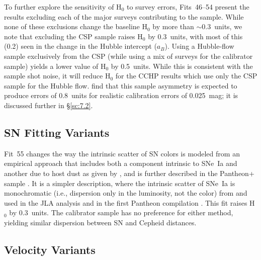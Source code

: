 \documentclass[12pt]{aastex631}
\begin{document}
To further explore the sensitivity of H$_0$ to survey errors, Fits~46--54 present the results excluding each of the major surveys contributing to the sample.  While none of these exclusions change the baseline H$_0$ by more than $\sim 0.3$~units, we note that excluding the CSP sample raises H$_0$ by 0.3~units, with most of this (0.2) seen in the change in the Hubble intercept ($a_B$). Using a Hubble-flow sample exclusively from the CSP (while using a mix of surveys for the calibrator sample) yields a lower value of H$_0$ by 0.5~units.  While this is consistent with the sample shot noise, it will reduce H$_0$ for the CCHP results which use only the CSP sample for the Hubble flow.  \citet{Brownsberger:2021} find that this sample asymmetry is expected to produce errors of 0.8~units for realistic calibration errors of 0.025~mag; it is discussed further in \S\ref{sc:7.2}.  

\subsection{SN Fitting Variants\label{sc:6.11}}

Fit~55 changes the way the intrinsic scatter of SN colors is modeled from an empirical approach that includes both a component intrinsic to SNe~Ia and another due to host dust as given by \citet{Brout:2021}, and is further described in the Pantheon+ sample \citep{Brout:2022,Scolnic:2021}. It is a simpler description, where the intrinsic scatter of SNe~Ia is monochromatic (i.e., dispersion only in the luminosity, not the color) from \citet{Guy:2010} and used in the JLA analysis \citep{Betoule:2014} and in the first Pantheon compilation \citep{Scolnic:2018}.  This fit raises H$_0$ by 0.3~units.  The calibrator sample has no preference for either method, yielding similar dispersion between SN and Cepheid distances. 

\subsection{Velocity Variants\label{sc:6.12}}
\end{document}
